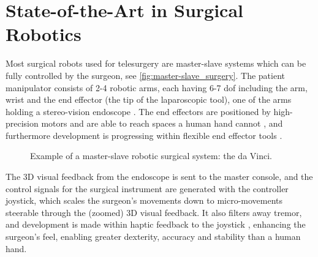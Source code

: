 






\section{State-of-the-Art in Surgical Robotics}

\vspace{-1mm}
Most surgical robots used for telesurgery are master-slave systems which can be fully controlled by the surgeon, see \autoref{fig:master-slave_surgery}. %
The patient manipulator consists of 2-4 robotic arms, each having 6-7 \gls{dof} %
including the arm, wrist and the end effector (the tip of the laparoscopic tool), one of the arms holding a stereo-vision \gls{endoscope} \citep{bib:raven_debride}. 
The end effectors are positioned by high-precision motors and are able to reach spaces a human hand cannot \citep{bib:docatadist}, and furthermore development is progressing within flexible end effector tools \citep[p 74]{bib:surgical_book}. %

\vspace{-3mm}
\begin{figure}[htbp]
\hspace*{-5mm}
%
%
\caption{Example of a master-slave robotic surgical system: the da Vinci.}
\label{fig:master-slave_surgery}
\end{figure}

The 3D visual feedback from the endoscope is sent to the master console, %
and the control signals for the surgical instrument are generated with the controller joystick, which scales the surgeon's movements down to micro-movements \citep{bib:intuitive_monopoly} steerable through the (zoomed) 3D visual feedback. It also filters away tremor, and development is made within haptic feedback to the joystick \citep[p 89]{bib:surgical_book}, enhancing the surgeon's feel, enabling greater dexterity, accuracy and stability than a human hand.

